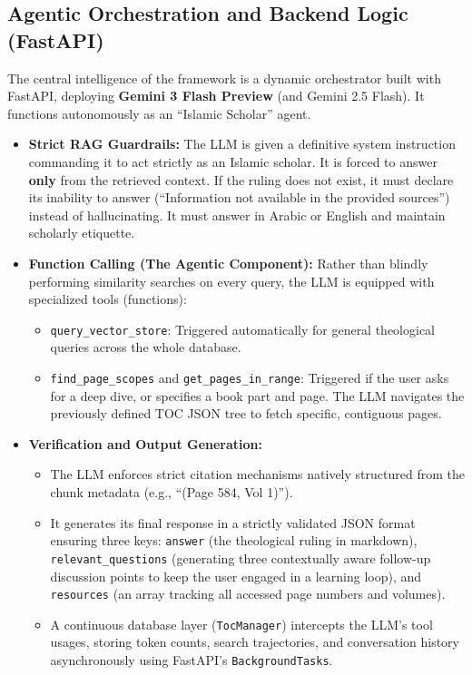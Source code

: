 \subsection{Agentic Orchestration and Backend Logic (FastAPI)}
The central intelligence of the framework is a dynamic orchestrator built with FastAPI, deploying \textbf{Gemini 3 Flash Preview} (and Gemini 2.5 Flash). It functions autonomously as an ``Islamic Scholar'' agent.

\begin{itemize}
    \item \textbf{Strict RAG Guardrails:} The LLM is given a definitive system instruction commanding it to act strictly as an Islamic scholar. It is forced to answer \textbf{only} from the retrieved context. If the ruling does not exist, it must declare its inability to answer (``Information not available in the provided sources'') instead of hallucinating. It must answer in Arabic or English and maintain scholarly etiquette.
    \item \textbf{Function Calling (The Agentic Component):} Rather than blindly performing similarity searches on every query, the LLM is equipped with specialized tools (functions):
    \begin{itemize}
        \item \texttt{query\_vector\_store}: Triggered automatically for general theological queries across the whole database.
        \item \texttt{find\_page\_scopes} and \texttt{get\_pages\_in\_range}: Triggered if the user asks for a deep dive, or specifies a book part and page. The LLM navigates the previously defined TOC JSON tree to fetch specific, contiguous pages.
    \end{itemize}
    \item \textbf{Verification and Output Generation:}
    \begin{itemize}
        \item The LLM enforces strict citation mechanisms natively structured from the chunk metadata (e.g., ``(Page 584, Vol 1)'').
        \item It generates its final response in a strictly validated JSON format ensuring three keys: \texttt{answer} (the theological ruling in markdown), \texttt{relevant\_questions} (generating three contextually aware follow-up discussion points to keep the user engaged in a learning loop), and \texttt{resources} (an array tracking all accessed page numbers and volumes).
        \item A continuous database layer (\texttt{TocManager}) intercepts the LLM's tool usages, storing token counts, search trajectories, and conversation history asynchronously using FastAPI's \texttt{BackgroundTasks}.
    \end{itemize}
\end{itemize}
